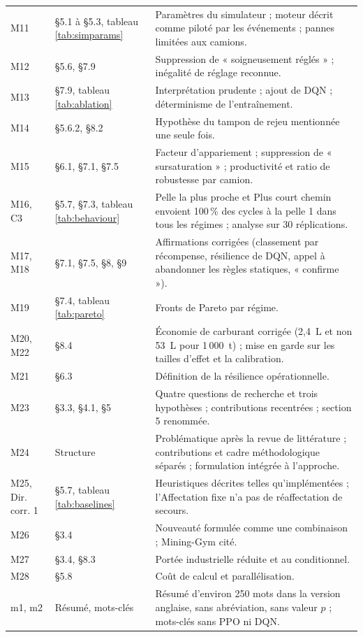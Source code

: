 \documentclass[11pt,a4paper]{article}
\begin{document}
\begin{longtable}{p{2.2cm}p{4.3cm}p{8.6cm}}
M11 & §5.1 à §5.3, tableau \ref{tab:simparams} & Paramètres du simulateur ; moteur décrit comme piloté par les événements ; pannes limitées aux camions. \\
M12 & §5.6, §7.9 & Suppression de « soigneusement réglés » ; inégalité de réglage reconnue. \\
M13 & §7.9, tableau \ref{tab:ablation} & Interprétation prudente ; ajout de DQN ; déterminisme de l'entraînement. \\
M14 & §5.6.2, §8.2 & Hypothèse du tampon de rejeu mentionnée une seule fois. \\
M15 & §6.1, §7.1, §7.5 & Facteur d'appariement ; suppression de « sursaturation » ; productivité et ratio de robustesse par camion. \\
M16, C3 & §5.7, §7.3, tableau \ref{tab:behaviour} & Pelle la plus proche et Plus court chemin envoient 100\,\% des cycles à la pelle 1 dans tous les régimes ; analyse sur 30 réplications. \\
M17, M18 & §7.1, §7.5, §8, §9 & Affirmations corrigées (classement par récompense, résilience de DQN, appel à abandonner les règles statiques, « confirme »). \\
M19 & §7.4, tableau \ref{tab:pareto} & Fronts de Pareto par régime. \\
M20, M22 & §8.4 & Économie de carburant corrigée (2,4~L et non 53~L pour 1\,000~t) ; mise en garde sur les tailles d'effet et la calibration. \\
M21 & §6.3 & Définition de la résilience opérationnelle. \\
M23 & §3.3, §4.1, §5 & Quatre questions de recherche et trois hypothèses ; contributions recentrées ; section 5 renommée. \\
M24 & Structure & Problématique après la revue de littérature ; contributions et cadre méthodologique séparés ; formulation intégrée à l'approche. \\
M25, Dir. corr. 1 & §5.7, tableau \ref{tab:baselines} & Heuristiques décrites telles qu'implémentées ; l'Affectation fixe n'a pas de réaffectation de secours. \\
M26 & §3.4 & Nouveauté formulée comme une combinaison ; Mining-Gym cité. \\
M27 & §3.4, §8.3 & Portée industrielle réduite et au conditionnel. \\
M28 & §5.8 & Coût de calcul et parallélisation. \\
m1, m2 & Résumé, mots-clés & Résumé d'environ 250 mots dans la version anglaise, sans abréviation, sans valeur $p$ ; mots-clés sans PPO ni DQN. \\

\end{longtable}
\end{document}
